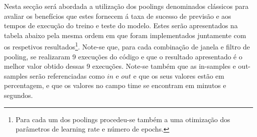 Nesta secção será abordada a utilização dos poolings denominados clássicos para avaliar os benefícios que estes fornecem á taxa de sucesso de previsão e aos tempos de execução do treino e teste do modelo. Estes serão apresentados na tabela abaixo pela mesma ordem em que foram implementados juntamente com os respetivos resultados\footnote{Para cada um dos poolings procedeu-se também a uma otimização dos parâmetros de learning rate e número de epochs.}. Note-se que, para cada combinação de janela e filtro de pooling, se realizaram 9 execuções do código e que o resultado apresentado é o melhor valor obtido dessas 9 execuções. Note-se também que as in-samples e out-samples serão referenciadas como $in$ e $out$ e que os seus valores estão em percentagem, e que os valores no campo time se encontram em minutos e segundos.

\begin{table}[h]
\end{table}


\begin{table}[h]
	\centering
\end{table}


